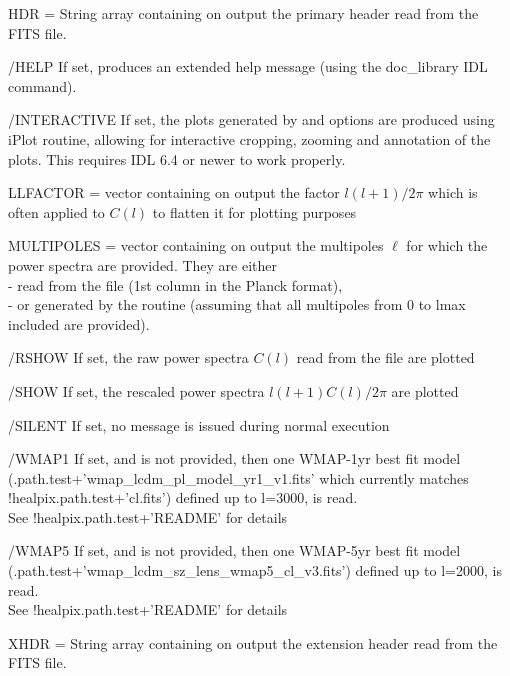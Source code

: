 \begin{keywords}
  \begin{kwlist}{} %
    \item[HDR =] %
	String array containing on output the primary header
      read from the FITS file. 
    \item[/HELP] %
	If set, produces an extended help message (using the doc\_library
    IDL command). 
    \item[/INTERACTIVE] %
	If set, the plots generated by  and  options are produced using iPlot routine, allowing 
           for interactive cropping, zooming and annotation of the plots. This
           requires IDL 6.4 or newer to work properly.
    \item[LLFACTOR =] %
	vector containing on output the factor $l(l+1)/2\pi$ which is often
          applied to $C(l)$ to flatten it for plotting purposes
    \item[MULTIPOLES =] %
	vector containing on output the multipoles
    $\ell$ for which the power spectra are provided. They are either\\
           - read from the file (1st column in the Planck format),\\
          - or generated by the routine (assuming that all
               multipoles from 0 to lmax included are provided).
    \item[/RSHOW] %
	If set, the raw power spectra $C(l)$ read from the file are plotted
    \item[/SHOW] %
	If set, the rescaled power spectra $l(l+1)C(l)/2\pi$ are plotted
    \item[/SILENT] %
	If set, no message is issued during normal execution
    \item[/WMAP1] %
           If set, and  
           is not provided, then one WMAP-1yr best fit
          model
(.path.test+\-'wmap\_lcdm\_pl\_model\_yr1\_v1.fits'
which currently matches !healpix.path.test+'cl.fits') 
          defined up to l=3000, is read.\\
          See !healpix.path.test+'README' for details
    \item[/WMAP5] %
           If set, and 
           is not provided, then one WMAP-5yr best fit
          model (.path.test+\-'wmap\_lcdm\_sz\_lens\_wmap5\_cl\_v3.fits') 
          defined up to l=2000, is read.\\
          See !healpix.path.test+'README' for details
    \item[XHDR =] %
	String array containing on output the extension header
      read from the FITS file. 
  \end{kwlist}
\end{keywords}  

